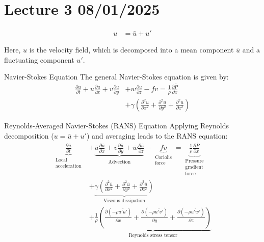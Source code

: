 \documentclass[fleqn,10pt]{SelfArx} %
\begin{document}
\section{Lecture 3 08/01/2025}
\begin{align*}
	u & = \bar{u} + u' \tag{3.1} \label{eq:u}
\end{align*}

Here, $u$ is the velocity field, which is decomposed into a mean component $\bar{u}$ and a fluctuating component $u'$.

Navier-Stokes Equation
The general Navier-Stokes equation is given by:
\begin{equation}
	\begin{aligned}
		\frac{\partial u}{\partial t} + u \frac{\partial u}{\partial x} + v \frac{\partial u}{\partial y} & + w \frac{\partial u}{\partial z} - f v = \frac{1}{\rho} \frac{\partial \bar{P}}{\partial x} \\  & + \gamma \left(\frac{\partial^2 u}{\partial x^2} + \frac{\partial^2 u}{\partial y^2}+ \frac{\partial^2 u}{\partial z^2}\right)
	\end{aligned}
	\tag{3.2} \label{eq:Navier-stokes}
\end{equation}

Reynolds-Averaged Navier-Stokes (RANS) Equation
Applying Reynolds decomposition ($u = \bar{u} + u'$) and averaging leads to the RANS equation:
\begin{equation}
	\begin{aligned}
		\underbrace{\frac{\partial \bar{u}}{\partial t}}_{\substack{\text{Local} \\ \text{acceleration}}} &+ \underbrace{\bar{u} \frac{\partial \bar{u}}{\partial x} + \bar{v} \frac{\partial \bar{u}}{\partial y} + \bar{w} \frac{\partial \bar{u}}{\partial z}}_{\substack{\text{Advection}}} - \underbrace{f \bar{v}}_{\substack{\text{Coriolis} \\ \text{force}}} = \underbrace{\frac{1}{\rho} \frac{\partial \bar{P}}{\partial x}}_{\substack{\text{Pressure} \\ \text{gradient} \\ \text{force}}} \\  & + \underbrace{\gamma \left(\frac{\partial^2 \bar{u}}{\partial x^2} + \frac{\partial^2 \bar{u}}{\partial y^2} + \frac{\partial^2 \bar{u}}{\partial z^2}\right)}_{\text{Viscous dissipation}} \\ & + \underbrace{\frac{1}{\rho} \left(\frac{\partial \left(-\rho \overline{u'u'} \right)}{\partial x} + \frac{\partial \left(-\rho \overline{u'v'} \right)}{\partial y} + \frac{\partial \left(-\rho \overline{u'w'} \right)}{\partial z}\right)}_{\text{Reynolds stress tensor}}
	\end{aligned}
	\tag{3.3} \label{eq:rans}
\end{equation}
\end{document}
